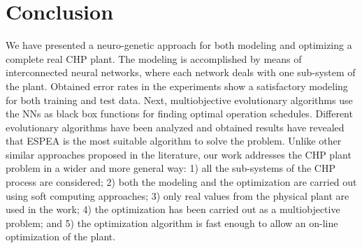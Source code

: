 \section{Conclusion}

We have presented a neuro-genetic approach for both modeling and optimizing a complete real CHP plant. The modeling is accomplished by means of interconnected neural networks, where each network deals with one sub-system of the plant. Obtained error rates in the experiments show a satisfactory modeling for both training and test data. Next, multiobjective evolutionary algorithms use the NNs as black box functions for finding optimal operation schedules. Different evolutionary algorithms have been analyzed and obtained results have revealed that ESPEA is the most suitable algorithm to solve the problem. Unlike other similar approaches proposed in the literature, our work addresses the CHP plant problem in a wider and more general way: 1) all the sub-systems of the CHP process are considered; 2) both the modeling and the optimization are carried out using soft computing approaches; 3) only real values from the physical plant are used in the work; 4) the optimization has been carried out as a multiobjective problem; and 5) the optimization algorithm is fast enough to allow an on-line optimization of the plant.
 
